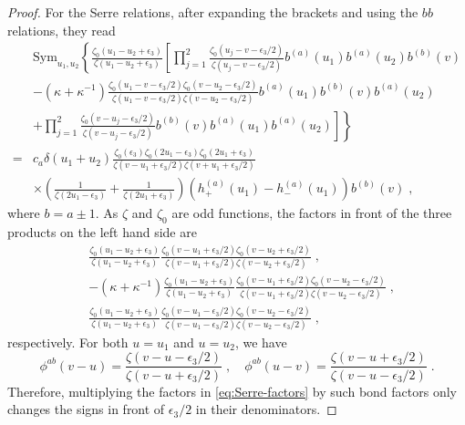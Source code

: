 \documentclass[11pt]{article}
\numberwithin{equation}{section}
\numberwithin{figure}{section}
\numberwithin{table}{section}
\begin{document}
\begin{proof}
	For the Serre relations, after expanding the brackets and using the $bb$ relations, they read
	\begin{align}
		&\mathrm{Sym}_{u_1,u_2}\left\{\frac{\zeta_0(u_1-u_2+\epsilon_3)}
        {\zeta(u_1-u_2+\epsilon_3)}\left[\prod_{j=1}^2\frac{\zeta_0(u_j-v-\epsilon_3/2)}{\zeta(u_j-v-\epsilon_3/2)}b^{(a)}(u_1)b^{(a)}(u_2)b^{(b)}(v)\right.\right.\nonumber\\
	    &-\left(\kappa+\kappa^{-1}\right)\frac{\zeta_0(u_1-v-\epsilon_3/2)\zeta_0(v-u_2-\epsilon_3/2)}{\zeta(u_1-v-\epsilon_3/2)\zeta(v-u_2-\epsilon_3/2)}b^{(a)}(u_1)b^{(b)}(v)b^{(a)}(u_2)\nonumber\\
	    &\left.\left.+\prod_{j=1}^2\frac{\zeta_0(v-u_j-\epsilon_3/2)}{\zeta(v-u_j-\epsilon_3/2)}b^{(b)}(v)b^{(a)}(u_1)b^{(a)}(u_2)\right]\right\}\nonumber\\
	    =&c_a\delta(u_1+u_2)\frac{\zeta_0(\epsilon_3)\zeta_0(2u_1-\epsilon_3)\zeta_0(2u_1+\epsilon_3)}{\zeta(v-u_1+\epsilon_3/2)\zeta(v+u_1+\epsilon_3/2)}\nonumber\\
	    &\times\left(\frac{1}{\zeta(2u_1-\epsilon_3)}+\frac{1}{\zeta(2u_1+\epsilon_3)}\right)\left(h_+^{(a)}(u_1)-h_-^{(a)}(u_1)\right)b^{(b)}(v)\;,
	\end{align}
	where $b=a\pm1$. As $\zeta$ and $\zeta_0$ are odd functions, the factors in front of the three products on the left hand side are
	\begin{align}
        &\frac{\zeta_0(u_1-u_2+\epsilon_3)}{\zeta(u_1-u_2+\epsilon_3)}\frac{\zeta_0(v-u_1+\epsilon_3/2)\zeta_0(v-u_2+\epsilon_3/2)}{\zeta(v-u_1+\epsilon_3/2)\zeta(v-u_2+\epsilon_3/2)}\;,\nonumber\\
        &-\left(\kappa+\kappa^{-1}\right)\frac{\zeta_0(u_1-u_2+\epsilon_3)}{\zeta(u_1-u_2+\epsilon_3)}\frac{\zeta_0(v-u_1+\epsilon_3/2)\zeta_0(v-u_2-\epsilon_3/2)}{\zeta(v-u_1+\epsilon_3/2)\zeta(v-u_2-\epsilon_3/2)}\;,\nonumber\\
        &\frac{\zeta_0(u_1-u_2+\epsilon_3)}{\zeta(u_1-u_2+\epsilon_3)}\frac{\zeta_0(v-u_1-\epsilon_3/2)\zeta_0(v-u_2-\epsilon_3/2)}{\zeta(v-u_1-\epsilon_3/2)\zeta(v-u_2-\epsilon_3/2)}\;,\label{eq:Serre-factors}
    \end{align}
    respectively. For both $u=u_1$ and $u=u_2$, we have
	\begin{equation}
		\phi^{ab}(v-u)=\frac{\zeta(v-u-\epsilon_3/2)}{\zeta(v-u+\epsilon_3/2)}\;,\quad\phi^{ab}(u-v)=\frac{\zeta(v-u+\epsilon_3/2)}{\zeta(v-u-\epsilon_3/2)}\;.\label{eq:Serre-phi-ab}
	\end{equation}
	Therefore, multiplying the factors in \eqref{eq:Serre-factors} by such bond factors only changes the signs in front of $\epsilon_3/2$ in their denominators.
	

\end{proof}
\end{document}
